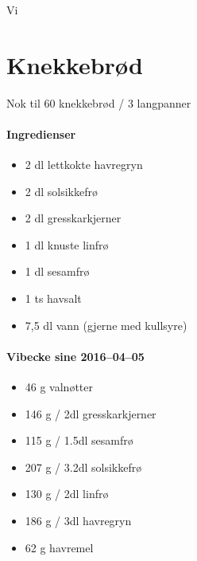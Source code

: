 Vi\section{﻿Knekkebrød}
Nok til 60 knekkebrød / 3 langpanner

\paragraph{Ingredienser}
\begin{itemize}[noitemsep]
	\item 2 dl lettkokte havregryn
	\item 2 dl solsikkefrø
	\item 2 dl gresskarkjerner
	\item 1 dl knuste linfrø
	\item 1 dl sesamfrø
	\item 1 ts havsalt
	\item 7,5 dl vann (gjerne med kullsyre)
\end{itemize}

\paragraph{Vibecke sine 2016--04--05}
\begin{itemize}[noitemsep]
	\item 46 g valnøtter
	\item 146 g / 2dl gresskarkjerner
	\item 115 g / 1.5dl sesamfrø
	\item 207 g / 3.2dl solsikkefrø
	\item 130 g / 2dl linfrø
	\item 186 g / 3dl havregryn
	\item 62 g havremel
\end{itemize}

